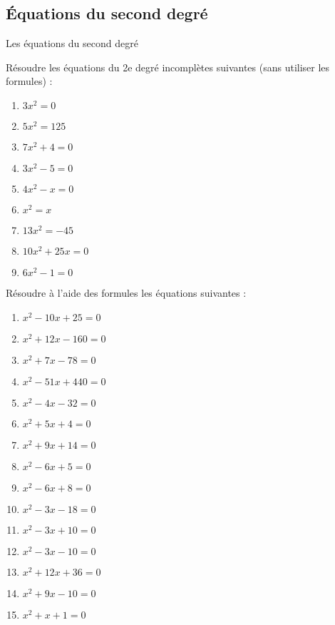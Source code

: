 \subsection{\'Equations du second degré}
Les équations du second degré

\begin{exercice}
Résoudre les équations du 2e degré incomplètes suivantes (sans utiliser les formules) :
\begin{multicols}{2}
\begin{enumerate}
\item $3{{x}^{2}}=0$ 
\item $5{{x}^{2}}=125$ 
\item $7{{x}^{2}}+4=0$ 
\item $3{{x}^{2}}-5=0$
\item $4{{x}^{2}}-x=0$
\item ${{x}^{2}}=x$
\item $13{{x}^{2}}=-45$
\item $10{{x}^{2}}+25x=0$
\item $6{{x}^{2}}-1=0$
\end{enumerate}
\end{multicols}
\end{exercice}

\begin{exercice}
Résoudre à l’aide des formules les équations suivantes :
\begin{multicols}{2}
\begin{enumerate}
\item ${{x}^{2}}-10x+25=0$ 
\item ${{x}^{2}}+12x-160=0$ 
\item ${{x}^{2}}+7x-78=0$ 
\item ${{x}^{2}}-51x+440=0$ 
\item ${{x}^{2}}-4x-32=0$ 
\item ${{x}^{2}}+5x+4=0$
\item ${{x}^{2}}+9x+14=0$
\item ${{x}^{2}}-6x+5=0$
\item ${{x}^{2}}-6x+8=0$
\item ${{x}^{2}}-3x-18=0$
\item ${{x}^{2}}-3x+10=0$
\item ${{x}^{2}}-3x-10=0$
\item ${{x}^{2}}+12x+36=0$
\item ${{x}^{2}}+9x-10=0$
\item ${{x}^{2}}+x+1=0$
\end{enumerate}
\end{multicols}
\end{exercice}

